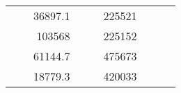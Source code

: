 \begin{table}[H]
\begin{tabular}{|ccrccrccc}
\multicolumn{1}{|c|}{\cellcolor[HTML]{FFFFC7}}                                & \multicolumn{1}{c|}{\cellcolor[HTML]{DAE8FC}}                      & \multicolumn{1}{r|}{\cellcolor[HTML]{DAE8FC}36897.1}   & \multicolumn{1}{c|}{\cellcolor[HTML]{FFFFC7}}                                & \multicolumn{1}{c|}{\cellcolor[HTML]{DAE8FC}}                       & \multicolumn{1}{r|}{\cellcolor[HTML]{DDFDFF}225521}    &                                                                              &                                                                    &                                                        \\ \cline{3-3} \cline{6-6}
\multicolumn{1}{|c|}{\cellcolor[HTML]{FFFFC7}}                                & \multicolumn{1}{c|}{\cellcolor[HTML]{DAE8FC}}                      & \multicolumn{1}{r|}{\cellcolor[HTML]{DDFDFF}103568}    & \multicolumn{1}{c|}{\cellcolor[HTML]{FFFFC7}}                                & \multicolumn{1}{c|}{\cellcolor[HTML]{DAE8FC}}                       & \multicolumn{1}{r|}{\cellcolor[HTML]{DAE8FC}225152}    &                                                                              &                                                                    &                                                        \\ \cline{3-3} \cline{6-6}
\multicolumn{1}{|c|}{\cellcolor[HTML]{FFFFC7}}                                & \multicolumn{1}{c|}{\cellcolor[HTML]{DAE8FC}}                      & \multicolumn{1}{r|}{\cellcolor[HTML]{DAE8FC}61144.7}   & \multicolumn{1}{c|}{\cellcolor[HTML]{FFFFC7}}                                & \multicolumn{1}{c|}{\cellcolor[HTML]{DAE8FC}}                       & \multicolumn{1}{r|}{\cellcolor[HTML]{DDFDFF}475673}    &                                                                              &                                                                    &                                                        \\ \cline{3-3} \cline{6-6}
\multicolumn{1}{|c|}{\cellcolor[HTML]{FFFFC7}}                                & \multicolumn{1}{c|}{\cellcolor[HTML]{DAE8FC}}                      & \multicolumn{1}{r|}{\cellcolor[HTML]{DDFDFF}18779.3}   & \multicolumn{1}{c|}{\cellcolor[HTML]{FFFFC7}}                                & \multicolumn{1}{c|}{\cellcolor[HTML]{DAE8FC}}                       & \multicolumn{1}{r|}{\cellcolor[HTML]{DAE8FC}420033}    &                                                                              &                                                                    &                                                        \\ \cline{3-3} \cline{6-6}

\end{tabular}
\end{table}
